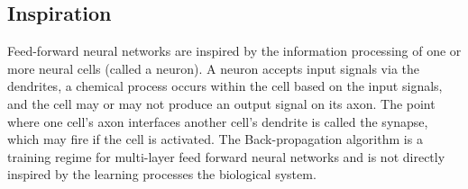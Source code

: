 \subsection{Inspiration}
Feed-forward neural networks are inspired by the information processing of one or more neural cells (called a neuron). 
A neuron accepts input signals via the dendrites, a chemical process occurs within the cell based on the input signals, and the cell may or may not produce an output signal on its axon. The point where one cell's axon interfaces another cell's dendrite is called the synapse, which may fire if the cell is activated.
The Back-propagation algorithm is a training regime for multi-layer feed forward neural networks and is not directly inspired by the learning processes the biological system.


